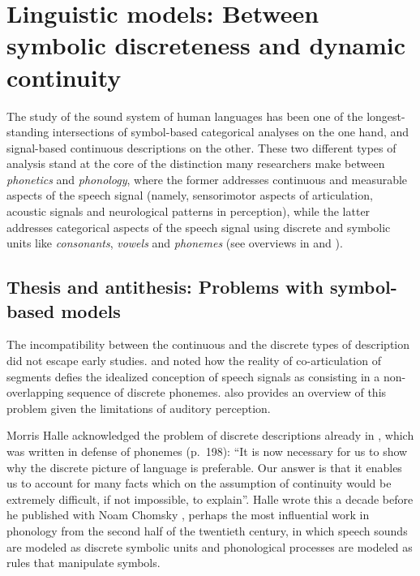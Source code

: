 
\chapter{Linguistic models: Between symbolic discreteness and dynamic continuity}\label{sec:lingMod}

The study of the sound system of human languages has been one of the longest-standing intersections of symbol-based categorical analyses on the one hand, and signal-based continuous descriptions on the other. These two different types of analysis stand at the core of the distinction many researchers make between \emph{phonetics} and \emph{phonology}, where the former addresses continuous and measurable aspects of the speech signal (namely, sensorimotor aspects of articulation, acoustic signals and neurological patterns in perception), while the latter addresses categorical aspects of the speech signal using discrete and symbolic units like \emph{consonants}, \emph{vowels} and \emph{phonemes} (see overviews in \citealt{harris2007representation} and \citealt{ladd2011phonetics}).

\section{Thesis and antithesis: Problems with symbol-based models}\label{sec:risenfall}

The incompatibility between the continuous and the discrete types of description did not escape early studies.
\citet{menzerath1933koartikulationsk, wickelgren1969context} and \citet{fowler1980coarticulation}
noted how the reality of co-articulation of segments defies the idealized conception of speech signals as consisting 
in a non-overlapping sequence of
discrete phonemes.
\citet[172--187]{warren1982auditory} also provides an overview of this problem given the limitations of auditory perception.

Morris Halle acknowledged the problem of discrete descriptions already in \citet{halle1954strategy}, which was written in defense of phonemes (p.~198): \enquote{It is now necessary for us to show why the discrete picture of language is preferable. Our answer is that it enables us to account for many facts which on the assumption of continuity would be extremely difficult, if not impossible, to explain}.
Halle wrote this a decade before he published  with Noam Chomsky \citep{chomsky1968spesk}, perhaps the most influential work in phonology from the second half of the twentieth century, in which speech sounds are modeled as discrete symbolic units and phonological processes are modeled as rules that manipulate symbols.

